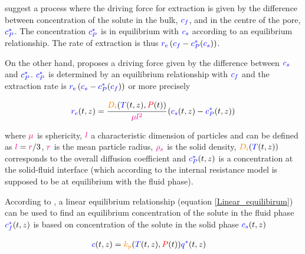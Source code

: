 \documentclass[../Article_Model_Parameters.tex]{subfiles}
\begin{document}
		\citet{Bulley1984} suggest a process where the driving force for extraction is given by the difference between concentration of the solute in the bulk, ${\color{blue}c_f}$, and in the centre of the pore, ${\color{blue}c_P^*}$. The concentration ${\color{blue}c_P^*}$ is in equilibrium with ${\color{blue}c_s}$ according to an equilibrium relationship. The rate of extraction is thus ${\color{blue}r_\text{e}}\left({\color{blue}c_f} - {\color{blue}c^*_P}({\color{blue}c_s})\right)$. 
			
		On the other hand, \citet{Reverchon1996} proposes a driving force given by the difference between ${\color{blue}c_s}$ and ${\color{blue}c_P^*}$. ${\color{blue}c_P^*}$ is determined by an equilibrium relationship with ${\color{blue}c_f}$ and the extraction rate is ${\color{blue}r_\text{e}}\left({\color{blue}c_s} - {\color{blue}c^*_P}({\color{blue}c_f})\right)$ or more precisely
			
			{\footnotesize
				\begin{equation} \label{Model_kinetic_basic}
					{\color{blue}r_e}(t,z) = \cfrac{{\color{orange}D_i}({\color{blue}T}(t,z), {\color{red}P}(t))}{{\color{magenta} \mu l^2} }\left({\color{blue}c_s}(t,z) - {\color{blue}c_P^*}(t,z) \right)
			\end{equation} }
			
		where ${\color{magenta}\mu}$ is sphericity, ${\color{magenta}l}$ a characteristic dimension of particles and can be defined as ${\color{magenta}l} = {\color{magenta}r}/3$, ${\color{magenta}r}$ is the mean particle radius, ${\color{magenta}\rho_s}$ is the solid density, ${\color{orange}D_i}({\color{blue}T}(t,z))$ corresponds to the overall diffusion coefficient and ${\color{blue}c_P^*}(t,z)$ is a concentration at the solid-fluid interface (which according to the internal resistance model is supposed to be at equilibrium with the fluid phase). 
			
		According to \citet{Bulley1984}, a linear equilibrium relationship (equation  \ref{Linear_equilibirum}) can be used to find an equilibrium concentration of the solute in the fluid phase ${\color{blue}c_f^*}(t,z)$ is based on concentration of the solute in the solid phase ${\color{blue}c_s}(t,z)$ 
			
			{\footnotesize
				\begin{align} \label{Linear_equilibirum}
					{\color{blue}c}(t,z) &= {\color{orange}k_p}({\color{blue}T}(t,z),{\color{red}P}(t)) \allowbreak {\color{blue}q^*}(t,z)
			\end{align} }
			
\end{document}
